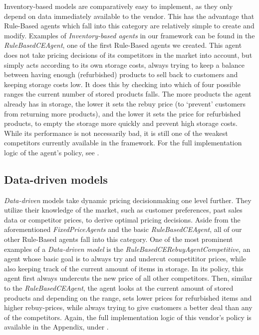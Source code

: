 Inventory-based models are comparatively easy to implement, as they only depend on data immediately available to the vendor. This has the advantage that Rule-Based agents which fall into this category are relatively simple to create and modify. Examples of \emph{Inventory-based agents} in our framework can be found in the \emph{RuleBasedCEAgent}, one of the first Rule-Based agents we created. This agent does not take pricing decisions of its competitors in the market into account, but simply acts according to its own storage costs, always trying to keep a balance between having enough (refurbished) products to sell back to customers and keeping storage costs low. It does this by checking into which of four possible ranges the current number of stored products falls. The more products the agent already has in storage, the lower it sets the rebuy price (to `prevent' customers from returning more products), and the lower it sets the price for refurbished products, to empty the storage more quickly and prevent high storage costs. While its performance is not necessarily bad, it is still one of the weakest competitors currently available in the framework. For the full implementation logic of the agent's policy, see .

\subsection*{Data-driven models}\label{subsec:DataDrivenModels}

\emph{Data-driven} models take dynamic pricing decisionmaking one level further. They utilize their knowledge of the market, such as customer preferences, past sales data or competitor prices, to derive optimal pricing decisions. Aside from the aforementioned \emph{FixedPriceAgents} and the basic \emph{RuleBasedCEAgent}, all of our other Rule-Based agents fall into this category. One of the most prominent examples of a \emph{Data-driven model} is the \emph{RuleBasedCERebuyAgentCompetitive}, an agent whose basic goal is to always try and undercut competititor prices, while also keeping track of the current amount of items in storage. In its policy, this agent first always undercuts the new price of all other competitors. Then, similar to the \emph{RuleBasedCEAgent}, the agent looks at the current amount of stored products and depending on the range, sets lower prices for refurbished items and higher rebuy-prices, while always trying to give customers a better deal than any of the competitors. Again, the full implementation logic of this vendor's policy is available in the Appendix, under .


